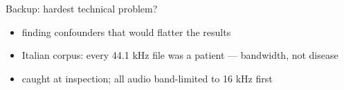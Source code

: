 \documentclass[aspectratio=169,11pt]{beamer}
\begin{document}
\begin{frame}{Backup: hardest technical problem?}
\begin{itemize}
  \item finding confounders that would flatter the results
  \item Italian corpus: every 44.1 kHz file was a patient ---
        bandwidth, not disease
  \item caught at inspection; all audio band-limited to 16 kHz first
\end{itemize}
\end{frame}
\end{document}

